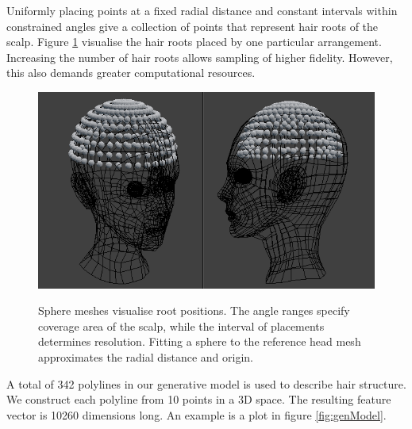 \documentclass[ %
author={Dillon Keith Diep},
supervisor={Dr. Carl Henrik Ek},
degree={MEng},
title={ART-CG Hair:},
subtitle={Assisted Real-time Content Generation of Stylised Virtual Hair},
type={Research},
year={2017} ]{dissertation}
\begin{document}
	Uniformly placing points at a fixed radial distance and constant intervals within constrained angles give a collection of points that represent hair roots of the scalp. Figure \ref{fig:roots} visualise the hair roots placed by one particular arrangement. Increasing the number of hair roots allows sampling of higher fidelity. However, this also demands greater computational resources.
	
	\begin{figure}[!h]
		\centering
		\caption{Sphere meshes visualise root positions. The angle ranges specify coverage area of the scalp, while the interval of placements determines resolution. Fitting a sphere to the reference head mesh approximates the radial distance and origin.}
		\includegraphics[scale=0.5]{images/spherePoints}\\
		\label{fig:roots}
	\end{figure}
	
	A total of 342 polylines in our generative model is used to describe hair structure. We construct each polyline from 10 points in a 3D space. The resulting feature vector is 10260 dimensions long. An example is a plot in figure \ref{fig:genModel}.
	
\end{document}
